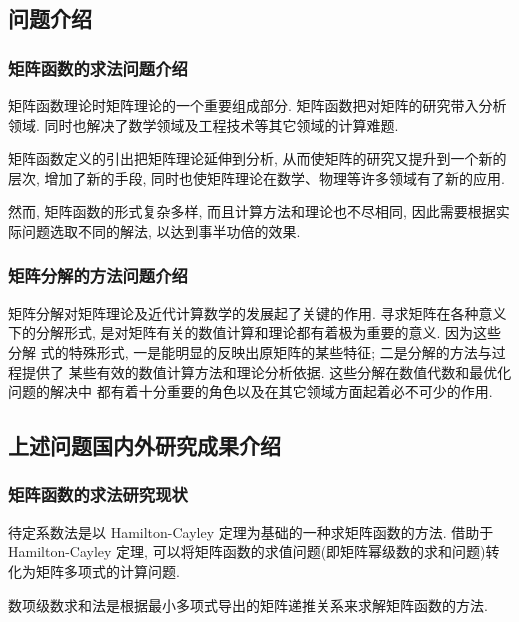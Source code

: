 \subsection{问题介绍}

\subsubsection{矩阵函数的求法问题介绍}

\par 矩阵函数理论时矩阵理论的一个重要组成部分. 矩阵函数把对矩阵的研究带入分析
领域. 同时也解决了数学领域及工程技术等其它领域的计算难题.

\par 矩阵函数定义的引出把矩阵理论延伸到分析, 从而使矩阵的研究又提升到一个新的
层次, 增加了新的手段, 同时也使矩阵理论在数学、物理等许多领域有了新的应用.

\par 然而, 矩阵函数的形式复杂多样, 而且计算方法和理论也不尽相同, 因此需要根据实
际问题选取不同的解法, 以达到事半功倍的效果.

\subsubsection{矩阵分解的方法问题介绍}

\par 矩阵分解对矩阵理论及近代计算数学的发展起了关键的作用. 寻求矩阵在各种意义
下的分解形式, 是对矩阵有关的数值计算和理论都有着极为重要的意义. 因为这些分解
式的特殊形式, 一是能明显的反映出原矩阵的某些特征; 二是分解的方法与过程提供了
某些有效的数值计算方法和理论分析依据. 这些分解在数值代数和最优化问题的解决中
都有着十分重要的角色以及在其它领域方面起着必不可少的作用.

\subsection{上述问题国内外研究成果介绍}

\subsubsection{矩阵函数的求法研究现状}

\par 待定系数法是以 Hamilton-Cayley 定理为基础的一种求矩阵函数的方法. 借助于 Hamilton-Cayley 定理, 可以将矩阵函数的求值问题(即矩阵幂级数的求和问题)转化为矩阵多项式的计算问题.

\par 数项级数求和法是根据最小多项式导出的矩阵递推关系来求解矩阵函数的方法.

